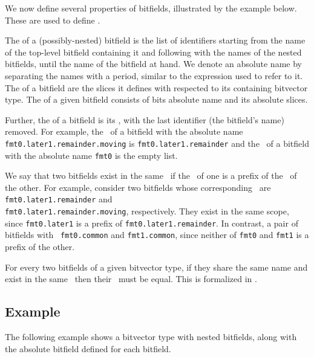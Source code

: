 We now define several properties of bitfields, illustrated by the example below.
These are used to define .

The \hypertarget{def-absolutename}{\absolutename} of a (possibly-nested) bitfield is the list of identifiers starting from the
name of the top-level bitfield containing it and following with the names of the nested bitfields,
until the name of the bitfield at hand. We denote an absolute name by separating the names with a
period, similar to the expression used to refer to it.
%
The \hypertarget{def-absoluteslice}{\absoluteslice} of a bitfield are the slices it defines with respected to its containing
bitvector type.
%
The \hypertarget{def-absolutebitfield}{\absolutebitfield} of a given bitfield consists of bits absolute name and its
absolute slices.

Further, the \hypertarget{def-bitfieldscope}{\bitfieldscope} of a bitfield is its \absolutename, with the last
identifier (the bitfield's name) removed.
For example, the \bitfieldscope\ of a bitfield with the absolute name \texttt{fmt0.later1.remainder.moving}
is \texttt{fmt0.later1.remainder} and the \bitfieldscope\ of a bitfield with the absolute name
\texttt{fmt0} is the empty list.

We say that two bitfields exist in the same \bitfieldscope\ if the \bitfieldscope\ of one is a prefix
of the \bitfieldscope\ of the other. For example, consider two bitfields whose corresponding \absolutenames\ are
\texttt{fmt0.later1.remainder} and \\
\texttt{fmt0.later1.remainder.moving}, respectively.
They exist in the same scope, since \texttt{fmt0.later1} is a prefix of
\texttt{fmt0.later1.remainder}.
In contrast, a pair of bitfields with \absolutenames\ \texttt{fmt0.common}
and \texttt{fmt1.common}, since neither of \texttt{fmt0} and \texttt{fmt1} is a prefix of the other.

For every two bitfields of a given bitvector type,
if they share the same name and exist in the same \bitfieldscope\ then their \absoluteslices\ must be
equal.
This is formalized in .

\subsection{Example}
The following example shows a bitvector type with nested bitfields, along with the absolute bitfield
defined for each bitfield.

